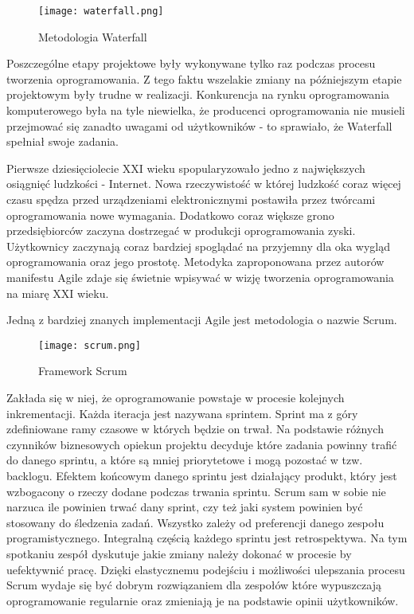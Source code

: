 \begin{figure}[htbp]
    \centering
    \texttt{[image: waterfall.png]}
    \caption{Metodologia Waterfall}
    \label{fig:waterfall}
\end{figure}
Poszczególne etapy projektowe były wykonywane tylko raz podczas procesu tworzenia oprogramowania. Z tego faktu wszelakie zmiany na późniejszym etapie projektowym były trudne w realizacji. Konkurencja na rynku oprogramowania komputerowego była na tyle niewielka, że producenci oprogramowania nie musieli przejmować się zanadto uwagami od użytkowników - to sprawiało, że Waterfall spełniał swoje zadania. 
\par
Pierwsze dziesięciolecie XXI wieku spopularyzowało jedno z największych osiągnięć ludzkości - Internet. Nowa rzeczywistość w której ludzkość coraz więcej czasu spędza przed urządzeniami elektronicznymi postawiła przez twórcami oprogramowania nowe wymagania. Dodatkowo coraz większe grono przedsiębiorców zaczyna dostrzegać w produkcji oprogramowania zyski. Użytkownicy zaczynają coraz bardziej spoglądać na przyjemny dla oka wygląd oprogramowania oraz jego prostotę. Metodyka zaproponowana przez autorów manifestu Agile zdaje się świetnie wpisywać w wizję tworzenia oprogramowania na miarę XXI wieku.
\par
Jedną z bardziej znanych implementacji Agile jest metodologia o nazwie Scrum.
\begin{figure}[htbp]
    \centering
    \texttt{[image: scrum.png]}
    \caption{Framework Scrum}
    \label{fig:scrum}
\end{figure}
Zakłada się w niej, że oprogramowanie powstaje w procesie kolejnych inkrementacji. Każda iteracja jest nazywana sprintem. Sprint ma z góry zdefiniowane ramy czasowe w których będzie on trwał. Na podstawie różnych czynników biznesowych opiekun projektu decyduje które zadania powinny trafić do danego sprintu, a które są mniej priorytetowe i mogą pozostać w tzw. backlogu. Efektem końcowym danego sprintu jest działający produkt, który jest wzbogacony o rzeczy dodane podczas trwania sprintu. Scrum sam w sobie nie narzuca ile powinien trwać dany sprint, czy też jaki system powinien być stosowany do śledzenia zadań. Wszystko zależy od preferencji danego zespołu programistycznego. Integralną częścią każdego sprintu jest retrospektywa. Na tym spotkaniu zespół dyskutuje jakie zmiany należy dokonać w procesie by uefektywnić pracę. Dzięki elastycznemu podejściu i możliwości ulepszania procesu Scrum wydaje się być dobrym rozwiązaniem dla zespołów które wypuszczają oprogramowanie regularnie oraz zmieniają je na podstawie opinii użytkowników.

